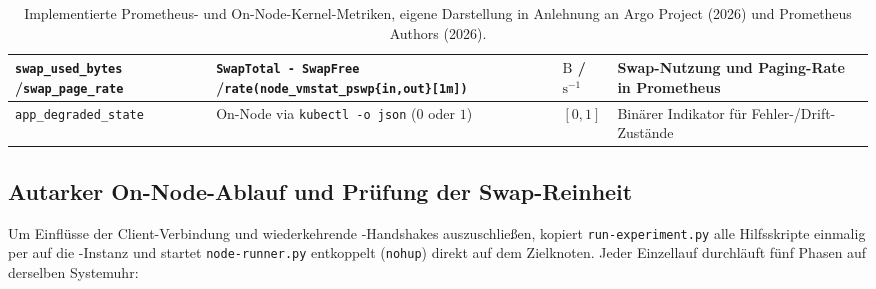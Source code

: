 \begin{table}[H]
\begin{tabularx}{\textwidth}{>{\raggedright\arraybackslash}p{3.4cm}|>{\raggedright\arraybackslash}p{5.5cm}|>{\raggedright\arraybackslash}p{0.9cm}|>{\raggedright\arraybackslash}X}
    \hline
    \texttt{\scriptsize swap\_used\_bytes} /\newline \texttt{\scriptsize swap\_page\_rate} & \texttt{\scriptsize SwapTotal - SwapFree} /\newline \texttt{\scriptsize rate(node\_vmstat\_pswp\{in,out\}[1m])} & $\text{B}$ /\newline $\text{s}^{-1}$ & Swap-Nutzung und Paging-Rate in Prometheus \\
    \hline
    \texttt{\scriptsize app\_degraded\_state} & On-Node via \texttt{\scriptsize kubectl -o json} ($0$ oder $1$) & $[0,1]$ & Binärer Indikator für Fehler-/Drift-Zustände \\
    \hline\hline
    \end{tabularx}
\caption{Implementierte Prometheus- und On-Node-Kernel-Metriken, eigene Darstellung in Anlehnung an Argo Project (2026) und Prometheus Authors (2026).}
\label{tab:prometheus-metriken-promql}
\end{table}

\subsection{Autarker On-Node-Ablauf und Prüfung der Swap-Reinheit}
\label{subsec:phasengesteuerter-versuchsablauf-swap}

Um Einflüsse der Client-Verbindung und wiederkehrende -Handshakes auszuschließen, kopiert \texttt{run-experiment.py} alle Hilfsskripte einmalig per  auf die -Instanz und startet \texttt{node-runner.py} entkoppelt (\texttt{nohup}) direkt auf dem Zielknoten. Jeder Einzellauf durchläuft fünf Phasen auf derselben Systemuhr:

